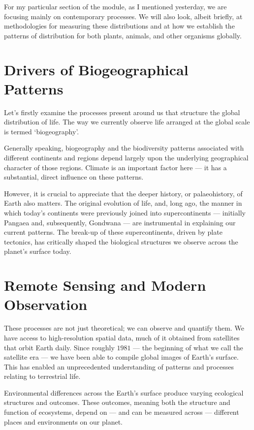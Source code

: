 \documentclass[
  10pt,
]{book}
\begin{document}
For my particular section of the module, as I mentioned yesterday, we
are focusing mainly on contemporary processes. We will also look, albeit
briefly, at methodologies for measuring these distributions and at how
we establish the patterns of distribution for both plants, animals, and
other organisms globally.

\section{Drivers of Biogeographical
Patterns}\label{drivers-of-biogeographical-patterns}

Let's firstly examine the processes present around us that structure the
global distribution of life. The way we currently observe life arranged
at the global scale is termed `biogeography'.

Generally speaking, biogeography and the biodiversity patterns
associated with different continents and regions depend largely upon the
underlying geographical character of those regions. Climate is an
important factor here --- it has a substantial, direct influence on
these patterns.

However, it is crucial to appreciate that the deeper history, or
palaeohistory, of Earth also matters. The original evolution of life,
and, long ago, the manner in which today's continents were previously
joined into supercontinents --- initially Pangaea and, subsequently,
Gondwana --- are instrumental in explaining our current patterns. The
break-up of these supercontinents, driven by plate tectonics, has
critically shaped the biological structures we observe across the
planet's surface today.

\section{Remote Sensing and Modern
Observation}\label{remote-sensing-and-modern-observation}

These processes are not just theoretical; we can observe and quantify
them. We have access to high-resolution spatial data, much of it
obtained from satellites that orbit Earth daily. Since roughly \(1981\)
--- the beginning of what we call the satellite era --- we have been
able to compile global images of Earth's surface. This has enabled an
unprecedented understanding of patterns and processes relating to
terrestrial life.

Environmental differences across the Earth's surface produce varying
ecological structures and outcomes. These outcomes, meaning both the
structure and function of ecosystems, depend on --- and can be measured
across --- different places and environments on our planet.
\end{document}
